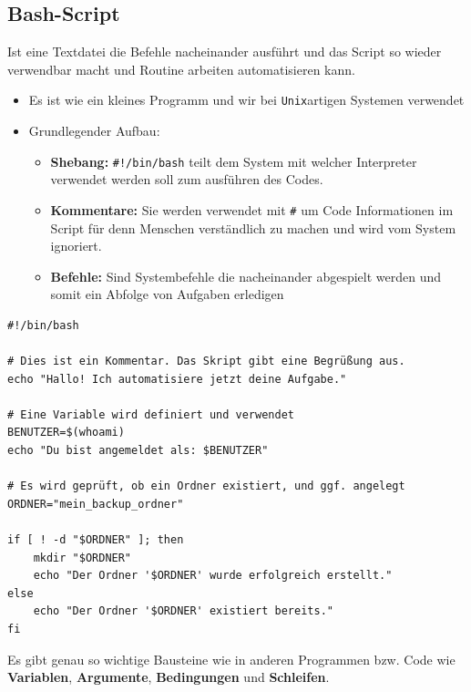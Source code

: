 \subsection{Bash-Script}

Ist eine Textdatei die Befehle nacheinander ausführt und das Script so wieder verwendbar macht und Routine arbeiten automatisieren kann.

\begin{itemize}
  \item Es ist wie ein kleines Programm und wir bei \texttt{Unix}artigen Systemen verwendet
  \item Grundlegender Aufbau:
  \begin{itemize}
    \item \textbf{Shebang:} \texttt{\#!/bin/bash} teilt dem System mit welcher Interpreter verwendet werden soll zum ausführen des Codes.
    \item \textbf{Kommentare:} Sie werden verwendet mit \texttt{\#} um Code Informationen im Script für denn Menschen verständlich zu machen und wird vom System ignoriert.
    \item \textbf{Befehle:} Sind Systembefehle die nacheinander abgespielt werden und somit ein Abfolge von Aufgaben erledigen
  \end{itemize}
\end{itemize}

\begin{verbatim}
#!/bin/bash

# Dies ist ein Kommentar. Das Skript gibt eine Begrüßung aus.
echo "Hallo! Ich automatisiere jetzt deine Aufgabe."

# Eine Variable wird definiert und verwendet
BENUTZER=$(whoami)
echo "Du bist angemeldet als: $BENUTZER"

# Es wird geprüft, ob ein Ordner existiert, und ggf. angelegt
ORDNER="mein_backup_ordner"

if [ ! -d "$ORDNER" ]; then
    mkdir "$ORDNER"
    echo "Der Ordner '$ORDNER' wurde erfolgreich erstellt."
else
    echo "Der Ordner '$ORDNER' existiert bereits."
fi
\end{verbatim}

Es gibt genau so wichtige Bausteine wie in anderen Programmen bzw. Code wie \textbf{Variablen}, \textbf{Argumente}, \textbf{Bedingungen} und \textbf{Schleifen}.
